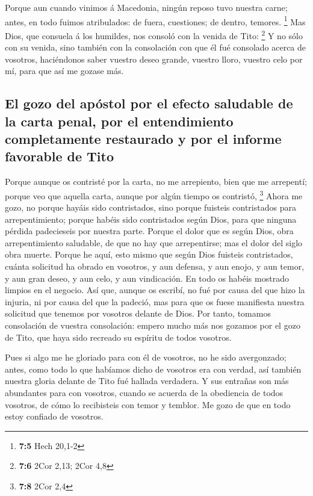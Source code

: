  Porque aun cuando vinimos á Macedonia, ningún reposo tuvo
nuestra carne; antes, en todo fuimos atribulados: de fuera, cuestiones;
de dentro, temores. \footnote{\textbf{7:5} Hech 20,1-2} 
Mas Dios, que consuela á los humildes, nos consoló con la venida de
Tito: \footnote{\textbf{7:6} 2Cor 2,13; 2Cor 4,8}  Y no
sólo con su venida, sino también con la consolación con que él fué
consolado acerca de vosotros, haciéndonos saber vuestro deseo grande,
vuestro lloro, vuestro celo por mí, para que así me gozase más.

\hypertarget{el-gozo-del-apuxf3stol-por-el-efecto-saludable-de-la-carta-penal-por-el-entendimiento-completamente-restaurado-y-por-el-informe-favorable-de-tito}{%
\subsection{El gozo del apóstol por el efecto saludable de la carta
penal, por el entendimiento completamente restaurado y por el informe
favorable de
Tito}\label{el-gozo-del-apuxf3stol-por-el-efecto-saludable-de-la-carta-penal-por-el-entendimiento-completamente-restaurado-y-por-el-informe-favorable-de-tito}}

 Porque aunque os contristé por la carta, no me
arrepiento, bien que me arrepentí; porque veo que aquella carta, aunque
por algún tiempo os contristó, \footnote{\textbf{7:8} 2Cor 2,4}
 Ahora me gozo, no porque hayáis sido contristados, sino
porque fuisteis contristados para arrepentimiento; porque habéis sido
contristados según Dios, para que ninguna pérdida padecieseis por
nuestra parte.  Porque el dolor que es según Dios, obra
arrepentimiento saludable, de que no hay que arrepentirse; mas el dolor
del siglo obra muerte.  Porque he aquí, esto mismo que
según Dios fuisteis contristados, cuánta solicitud ha obrado en
vosotros, y aun defensa, y aun enojo, y aun temor, y aun gran deseo, y
aun celo, y aun vindicación. En todo os habéis mostrado limpios en el
negocio.  Así que, aunque os escribí, no fué por causa
del que hizo la injuria, ni por causa del que la padeció, mas para que
os fuese manifiesta nuestra solicitud que tenemos por vosotros delante
de Dios.  Por tanto, tomamos consolación de vuestra
consolación: empero mucho más nos gozamos por el gozo de Tito, que haya
sido recreado su espíritu de todos vosotros.

 Pues si algo me he gloriado para con él de vosotros, no
he sido avergonzado; antes, como todo lo que habíamos dicho de vosotros
era con verdad, así también nuestra gloria delante de Tito fué hallada
verdadera.  Y sus entrañas son más abundantes para con
vosotros, cuando se acuerda de la obediencia de todos vosotros, de cómo
lo recibisteis con temor y temblor.  Me gozo de que en
todo estoy confiado de vosotros.

